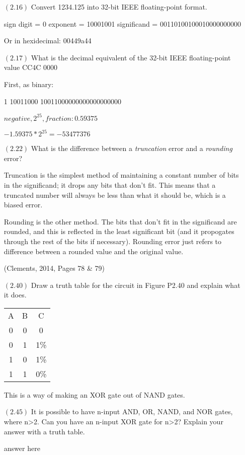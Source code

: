 \documentclass[letterpaper,12pt,titlepage]{article}
\begin{document}
\begin{enumerate}
\item[$(2.16)$] Convert 1234.125 into 32-bit IEEE floating-point format.
  
sign digit = 0
exponent = 10001001
significand = 00110100100010000000000

Or in hexidecimal: 00449a44 

\item[$(2.17)$] What is the decimal equivalent of the 32-bit IEEE floating-point value CC4C 0000
  
First, as binary:

1 10011000 10011000000000000000000

$ negative, 2^{25}, fraction: 0.59375 $ 

$ -1.59375 * 2^{25} = -53477376 $

\item[$(2.22)$] What is the difference between a \textit{truncation} error and a \textit{rounding} error? 
  
Truncation is the simplest method of maintaining a constant number of bits in the significand; it drops any bits that don't fit. This means that a truncated number will always be less than what it should be, which is a biased error.

Rounding is the other method. The bits that don't fit in the significand are rounded, and this is reflected in the least significant bit (and it propogates through the rest of the bits if necessary). Rounding error just refers to difference between a rounded value and the original value.

(Clements, 2014, Pages 78 \& 79)

\item[$(2.40)$] Draw a truth table for the circuit in Figure P2.40 and explain what it does.
  
\begin{tabular}{c c c}
A & B & C \\
0 & 0 & 0 \\
0 & 1 & 1\% \\
1 & 0 & 1\% \\
1 & 1 & 0\% \\
\end{tabular}

This is a way of making an XOR gate out of NAND gates.


\item[$(2.45)$] It is possible to have n-input AND, OR, NAND, and NOR gates, where n\textgreater 2. Can you have an n-input XOR gate for n\textgreater 2? Explain your answer with a truth table.
  
answer here

\end{enumerate}



\end{document}
